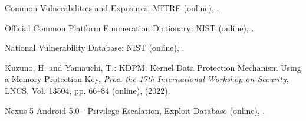 \documentclass[english,preprint,JIP]{ipsj}
\begin{document}




















\begin{thebibliography}{99}


    Common Vulnerabilities and Exposures: MITRE (online),
      .
    
    Official Common Platform Enumeration Dictionary: NIST (online), 
      .    


    National Vulnerability Database: NIST (online),
     .    

  
    Kuzuno, H. and Yamauchi, T.: KDPM: Kernel Data Protection Mechanism Using a Memory Protection Key,
    \textit{Proc. the 17th International Workshop on Security}, LNCS, Vol. 13504, pp. 66--84 (online),
     (2022).    

  Nexus 5 Android 5.0 - Privilege Escalation, Exploit Database (online),  . %



\end{thebibliography}
\end{document}
